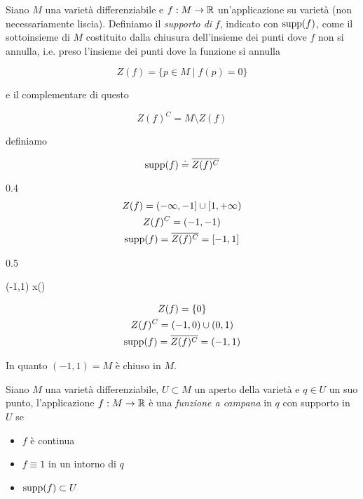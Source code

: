 Siano $ M $ una varietà differenziabile e $ f : M \to \mathbb{R} $ un'applicazione su varietà (non necessariamente liscia). Definiamo il \textit{supporto di} $ f $, indicato con $ \operatorname{supp}(f) $, come il sottoinsieme di $ M $ costituito dalla chiusura dell'insieme dei punti dove $ f $ non si annulla, i.e. preso l'insieme dei punti dove la funzione si annulla

\begin{equation}
	Z(f) = \{ p \in M \mid f(p) = 0 \}
\end{equation}

e il complementare di questo

\begin{equation}
	Z(f)^{C} = M \setminus Z(f)
\end{equation}

definiamo

\begin{equation}
	\operatorname{supp}(f) \doteq \overline{Z(f)^{C}}
\end{equation}

	{0.4}{%
			\begin{gather}
				Z(f) = (-\infty,-1] \cup [1,+\infty) \\
				Z(f)^{C} = (-1,-1) \\
				\operatorname{supp}(f) = \overline{Z(f)^{C}} = [-1,1]
			\end{gather}
			}

	{0.5}{%
				{(-1,1)}{\R}
				{x}{\tan()}
			
			\begin{gather}
				Z(f) = \{0\} \\
				Z(f)^{C} = (-1,0) \cup (0,1) \\
				\operatorname{supp}(f) = \overline{Z(f)^{C}} = (-1,1)
			\end{gather}
		
			In quanto $ (-1,1) = M $ è chiuso in $ M $.
			}

Siano $ M $ una varietà differenziabile, $ U \subset M $ un aperto della varietà e $ q \in U $ un suo punto, l'applicazione $ f : M \to \mathbb{R} $ è una \textit{funzione a campana} in $ q $ con supporto in $ U $ se

\begin{itemize}
	\item $ f $ è continua
	
	\item $ f \equiv 1 $ in un intorno di $ q $
	
	\item $ \operatorname{supp}(f) \subset U $
\end{itemize}

